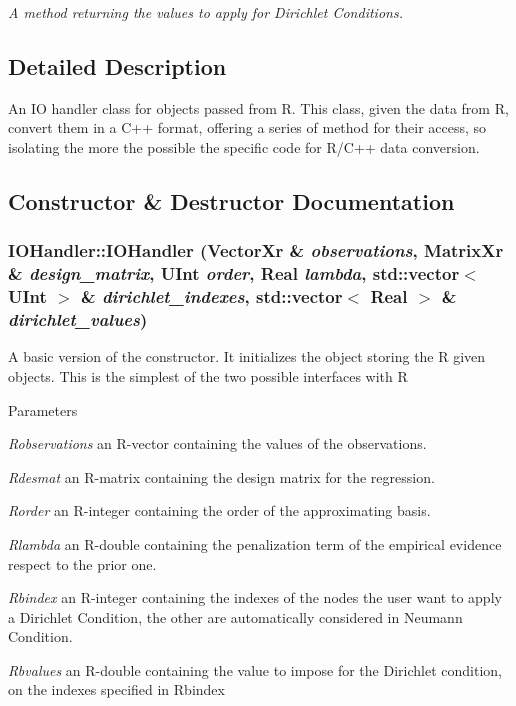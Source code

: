 \begin{DoxyCompactItemize}
\begin{DoxyCompactList}\small\item\em A method returning the values to apply for Dirichlet Conditions. \item\end{DoxyCompactList}\end{DoxyCompactItemize}


\subsection{Detailed Description}
An IO handler class for objects passed from R. This class, given the data from R, convert them in a C++ format, offering a series of method for their access, so isolating the more the possible the specific code for R/C++ data conversion. 

\subsection{Constructor \& Destructor Documentation}
\hypertarget{classIOHandler_ab29ae5702f6c5238cc0e33a84625e709}{
\subsubsection[{IOHandler}]{\setlength{\rightskip}{0pt plus 5cm}IOHandler::IOHandler (VectorXr \& {\em observations}, \/  MatrixXr \& {\em design\_\-matrix}, \/  UInt {\em order}, \/  Real {\em lambda}, \/  std::vector$<$ UInt $>$ \& {\em dirichlet\_\-indexes}, \/  std::vector$<$ Real $>$ \& {\em dirichlet\_\-values})}}
\label{classIOHandler_ab29ae5702f6c5238cc0e33a84625e709}


A basic version of the constructor. It initializes the object storing the R given objects. This is the simplest of the two possible interfaces with R 
\begin{DoxyParams}{Parameters}
\item[{\em Robservations}]an R-\/vector containing the values of the observations. \item[{\em Rdesmat}]an R-\/matrix containing the design matrix for the regression. \item[{\em Rorder}]an R-\/integer containing the order of the approximating basis. \item[{\em Rlambda}]an R-\/double containing the penalization term of the empirical evidence respect to the prior one. \item[{\em Rbindex}]an R-\/integer containing the indexes of the nodes the user want to apply a Dirichlet Condition, the other are automatically considered in Neumann Condition. \item[{\em Rbvalues}]an R-\/double containing the value to impose for the Dirichlet condition, on the indexes specified in Rbindex \end{DoxyParams}


